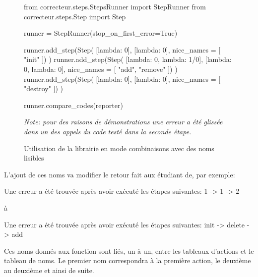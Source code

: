 \documentclass[a4paper]{report}
\begin{document}
\begin{figure}[ht]
\begin{python}
from correcteur.steps.StepsRunner import StepRunner
from correcteur.steps.Step import Step

runner = StepRunner(stop_on_first_error=True)

runner.add_step(Step(
	[lambda: 0],
	[lambda: 0],
	nice_names = [
		"init"
	])
)
runner.add_step(Step(
	[lambda: 0, lambda: 1/0],
	[lambda: 0, lambda: 0],
	nice_names = [
		"add",
		"remove"
	])
)
runner.add_step(Step(
	[lambda: 0],
	[lambda: 0],
	nice_names = [
		"destroy"
	])
)

runner.compare_codes(reporter)
\end{python}
	\caption{Utilisation de la librairie en mode combinaisons avec des noms lisibles}
	
	\textit{Note: pour des raisons de démonstrations une erreur a été glissée dans un des appels du code testé dans la seconde étape.}
	
	\label{fig:combinaisons_ref_name}
\end{figure}

L'ajout de ces noms va modifier le retour fait aux étudiant de, par exemple:
\begin{center}
Une erreur a été trouvée après avoir exécuté les étapes suivantes: 1 -> 1 -> 2
\end{center}
à
\begin{center}
Une erreur a été trouvée après avoir exécuté les étapes suivantes: init -> delete -> add
\end{center}

Ces noms donnés aux fonction sont liés, un à un, entre les tableaux d'actions et le tableau de noms.
Le premier nom correspondra à la première action, le deuxième au deuxième et ainsi de suite.
\end{document}
